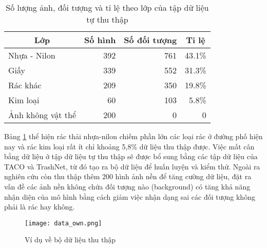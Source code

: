 \documentclass[../the.tex]{subfiles}
\begin{document}
\begin{table}[!ht]
	\centering
	\caption{Số lượng ảnh, đối tượng và tỉ lệ theo lớp của tập dữ liệu tự thu thập}
	\begin{tabular}{|l|r|r|r|}
		\hline
		\multicolumn{1}{|c|}{\textbf{Lớp}}
		                  & \multicolumn{1}{c|}{\textbf{Số hình}}
		                  & \multicolumn{1}{c|}{\textbf{Số đối tượng}}
		                  & \multicolumn{1}{c|}{\textbf{Tỉ lệ}}
		\\
		\hline

		Nhựa - Nilon      & 392                                      & 761 & 43.1\% \\
		\hline

		Giấy              & 339                                      & 552 & 31.3\% \\
		\hline

		Rác khác          & 209                                      & 350 & 19.8\% \\
		\hline

		Kim loại          & 60                                       & 103 & 5.8\%  \\
		\hline
		Ảnh không vật thể & 200                                      & 0   & 0      \\
		\hline
	\end{tabular}

	\label{tab:datasetown}
\end{table}

{\fontsize{13}{12} \selectfont

Bảng \ref{tab:datasetown} thể hiện rác thải nhựa-nilon chiếm phần lớn các loại rác ở đường phố hiện nay và rác kim loại rất ít chỉ khoảng 5,8\% dữ liệu thu thập được.
Việc mất cân bằng dữ liệu ở tập dữ liệu tự thu thập sẽ được bổ sung bằng các tập dữ liệu của TACO và TrashNet, từ đó tạo ra bộ dữ liệu để huấn luyện và kiểm thử.
Ngoài ra nghiên cứu còn thu thập thêm 200 hình ảnh nền để tăng cường dữ liệu, đặt ra vấn đề các ảnh nền không chứa đối tượng nào (background) có tăng khả năng nhận diện của mô hình bằng cách giảm việc nhận dạng sai các đối tượng không phải là rác hay không.

}


\begin{figure}[H]
	\centering
	\texttt{[image: data\_own.png]}
	\caption{Ví dụ về bộ dữ liệu thu thập}
	\label{fig:dataset_own}
\end{figure}
\end{document}

